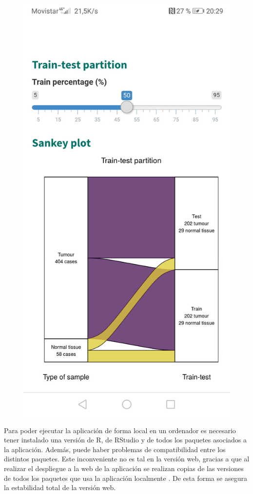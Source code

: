 \begin{center}
\begin{figure}[H]
\begin{minipage}{.5\textwidth}
		\end{minipage}%
		\begin{minipage}{.5\textwidth}
			\centering			\includegraphics[width=.825\textwidth]{figuras/52_app_huawei.jpg}
		\end{minipage}
	\end{figure}
\end{center}

Para poder ejecutar la aplicación de forma local en un ordenador es necesario tener instalado una versión de R, de RStudio y de todos los paquetes asociados a la aplicación. Además, puede haber problemas de compatibilidad entre los distintos paquetes. Este inconveniente no es tal en la versión web, gracias a que al realizar el despliegue a la web de la aplicación se realizan copias de las versiones de todos los paquetes que usa la aplicación localmente \cite{Shinyapps.ioteam2020}. De esta forma se asegura la estabilidad total de la versión web.\\

